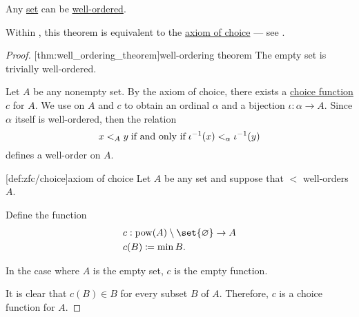 \begin{theorem}\label{thm:well_ordering_theorem}
  Any \hyperref[def:set]{set} can be \hyperref[def:well_ordered_set]{well-ordered}.

  Within \hyperref[def:zfc]{}, this theorem is equivalent to the \hyperref[def:zfc/choice]{axiom of choice} --- see .
\end{theorem}
\begin{proof}
  [thm:well_ordering_theorem]{well-ordering theorem} The empty set is trivially well-ordered.

  Let \( A \) be any nonempty set. By the axiom of choice, there exists a \hyperref[def:choice_function]{choice function} \( c \) for \( A \). We use  on \( A \) and \( c \) to obtain an ordinal \( \alpha \) and a bijection \( \iota: \alpha \to A \). Since \( \alpha \) itself is well-ordered, then the relation
  \begin{equation*}
    x <_A y \T{if and only if} \iota^{-1}(x) <_\alpha \iota^{-1}(y)
  \end{equation*}
  defines a well-order on \( A \).

  [def:zfc/choice]{axiom of choice} Let \( A \) be any set and suppose that \( < \) well-orders \( A \).

  Define the function
  \begin{equation*}
    \begin{aligned}
      &c: \pow(A) \setminus \set{ \varnothing } \to A \\
      &c(B) \coloneqq \min B.
    \end{aligned}
  \end{equation*}

  In the case where \( A \) is the empty set, \( c \) is the empty function.

  It is clear that \( c(B) \in B \) for every subset \( B \) of \( A \). Therefore, \( c \) is a choice function for \( A \).
\end{proof}
